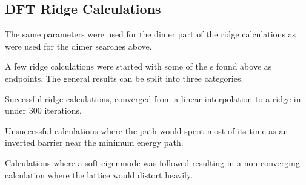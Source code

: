 \subsection{DFT Ridge Calculations}
The same parameters were used for the dimer part of the ridge calculations as were used for the dimer searches above.

A few ridge calculations were started with some of the s found above as endpoints.
The general results can be split into three categories.
\bit
\item Successful ridge calculations, converged from a linear interpolation to a ridge in under 300 iterations.
\item Unsuccessful calculations where the path would spent most of its time as an inverted barrier near the minimum energy path.
\item Calculations where a soft eigenmode was followed resulting in a non-converging calculation where the lattice would distort heavily.
\eit

